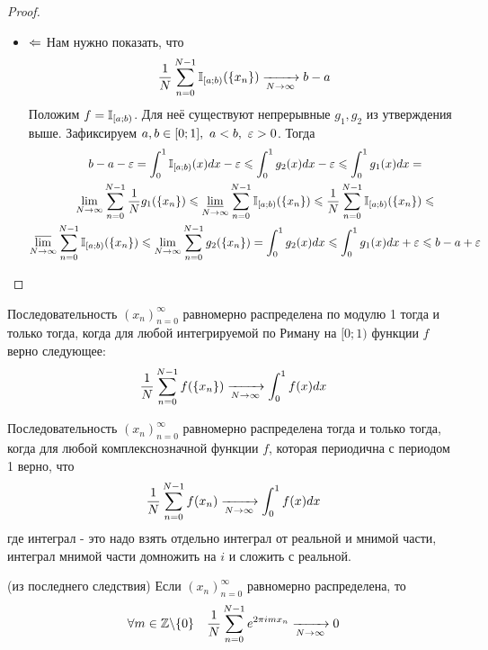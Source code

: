 \begin{proof}
\begin{enumerate}
\begin{itemize}
			\item $\Leftarrow$ Нам нужно показать, что
			\[
				\frac{1}{N} \sum\limits_{n = 0}^{N - 1} \mathbb{I}_{[a; b)}(\{x_n\}) \xrightarrow[N \to \infty]{} b - a
			\]
			Положим $f = \mathbb{I}_{[a; b)}$. Для неё существуют непрерывные $g_1, g_2$ из утверждения выше. Зафиксируем $a, b \in [0; 1],\ a < b,\ \varepsilon > 0$. Тогда
			\begin{multline*}
				b - a - \varepsilon = \int_0^1 \mathbb{I}_{[a; b)}(x)dx - \varepsilon \leqslant \int_0^1 g_2(x)dx - \varepsilon \leqslant \int_0^1 g_1(x)dx =
				\\
				\lim\limits_{N \to \infty} \sum\limits_{n = 0}^{N - 1} \frac{1}{N} g_1(\{x_n\}) \leqslant \varliminf\limits_{N \to \infty} \sum\limits_{n = 0}^{N - 1} \mathbb{I}_{[a; b)}(\{x_n\}) \leqslant \frac{1}{N} \sum\limits_{n = 0}^{N - 1} \mathbb{I}_{[a; b)}(\{x_n\}) \leqslant
				\\
				\varlimsup\limits_{N \to \infty} \sum\limits_{n = 0}^{N - 1} \mathbb{I}_{[a; b)}(\{x_n\}) \leqslant \lim\limits_{N \to \infty} \sum\limits_{n = 0}^{N - 1} g_2(\{x_n\}) = \int_0^1 g_2(x)dx \leqslant \int_0^1 g_1(x)dx + \varepsilon \leqslant b - a + \varepsilon
			\end{multline*}
		\end{itemize}
	\end{enumerate}
\end{proof}

\begin{corollary}
	Последовательность $(x_n)_{n = 0}^\infty$ равномерно распределена по модулю 1 тогда и только тогда, когда для любой интегрируемой по Риману на $[0; 1)$ функции $f$ верно следующее:
	\[
		\frac{1}{N} \sum\limits_{n = 0}^{N - 1} f(\{x_n\}) \xrightarrow[N \to \infty]{} \int_0^1 f(x)dx
	\] 
\end{corollary}

\begin{corollary}
	Последовательность $(x_n)_{n = 0}^\infty$ равномерно распределена тогда и только тогда, когда для любой комплекснозначной функции $f$, которая периодична с периодом 1 верно, что
	\[
		\frac{1}{N} \sum\limits_{n = 0}^{N - 1} f(x_n) \xrightarrow[N \to \infty]{} \int_0^1 f(x)dx
	\]
	где интеграл - это надо взять отдельно интеграл от реальной и мнимой части, интеграл мнимой части домножить на $i$ и сложить с реальной.
\end{corollary}

\begin{corollary} (из последнего следствия)
	Если $(x_n)_{n = 0}^\infty$ равномерно распределена, то
	\[
		\forall m \in \mathbb{Z} \backslash \{0\} \quad \frac{1}{N} \sum\limits_{n = 0}^{N - 1} e^{2\pi im x_n} \xrightarrow[N \to \infty]{} 0
	\]
\end{corollary}

